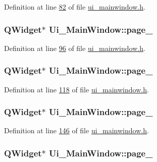 Definition at line \hyperlink{a00052_source_l00082}{82} of file \hyperlink{a00052_source}{ui\+\_\+mainwindow.\+h}.

\hypertarget{a00027_ad52b1b3da7f1a695b9d3b521254c961d}{
\subsubsection[{page\+\_\+4}]{\setlength{\rightskip}{0pt plus 5cm}Q\+Widget$\ast$ Ui\+\_\+\+Main\+Window\+::page\+\_}}\label{a00027_ad52b1b3da7f1a695b9d3b521254c961d}


Definition at line \hyperlink{a00052_source_l00096}{96} of file \hyperlink{a00052_source}{ui\+\_\+mainwindow.\+h}.

\hypertarget{a00027_a421261d29369be60b551aabe8b097597}{
\subsubsection[{page\+\_\+5}]{\setlength{\rightskip}{0pt plus 5cm}Q\+Widget$\ast$ Ui\+\_\+\+Main\+Window\+::page\+\_}}\label{a00027_a421261d29369be60b551aabe8b097597}


Definition at line \hyperlink{a00052_source_l00118}{118} of file \hyperlink{a00052_source}{ui\+\_\+mainwindow.\+h}.

\hypertarget{a00027_a48c3dca01f963265cd2ffca998842e05}{
\subsubsection[{page\+\_\+6}]{\setlength{\rightskip}{0pt plus 5cm}Q\+Widget$\ast$ Ui\+\_\+\+Main\+Window\+::page\+\_}}\label{a00027_a48c3dca01f963265cd2ffca998842e05}


Definition at line \hyperlink{a00052_source_l00146}{146} of file \hyperlink{a00052_source}{ui\+\_\+mainwindow.\+h}.

\hypertarget{a00027_a2a58b14a203be787ef1600453f795d71}{
\subsubsection[{page\+\_\+7}]{\setlength{\rightskip}{0pt plus 5cm}Q\+Widget$\ast$ Ui\+\_\+\+Main\+Window\+::page\+\_}}\label{a00027_a2a58b14a203be787ef1600453f795d71}


